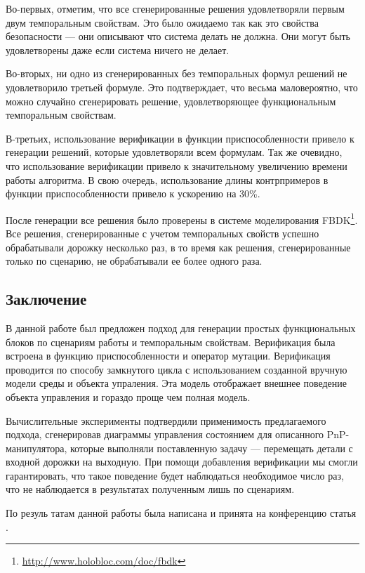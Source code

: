\documentclass[14pt]{article}
\begin{document}
Во-первых, отметим, что все сгенерированные решения удовлетворяли первым двум
темпоральным свойствам. Это было ожидаемо так как это свойства безопасности ---
они описывают что система делать не должна. Они могут быть удовлетворены даже
если система ничего не делает.

Во-вторых, ни одно из сгенерированных без темпоральных формул решений не удовлетворило
третьей формуле. Это подтверждает, что весьма маловероятно, что можно случайно
сгенерировать решение, удовлетворяющее функциональным темпоральным свойствам.

В-третьих, использование верификации в функции приспособленности привело
к генерации решений, которые удовлетворяли всем формулам. Так же очевидно, что использование
верификации привело к значительному увеличению времени работы алгоритма. В свою очередь,
использование длины контрпримеров в функции приспособленности привело к ускорению на 30\%.

После генерации все решения было проверены в системе моделирования FBDK\footnote{\url{http://www.holobloc.com/doc/fbdk}}.
Все решения, сгенерированные с учетом темпоральных свойств успешно обрабатывали дорожку несколько раз,
в то время как решения, сгенерированные только по сценарию, не обрабатывали ее более одного раза.

\subsection{Заключение}

В данной работе был предложен подход для генерации простых функциональных блоков по
сценариям работы и темпоральным свойствам. Верификация была встроена в функцию приспособленности и
оператор мутации. Верификация проводится по способу замкнутого цикла с использованием
созданной вручную модели среды и объекта упраления. Эта модель отображает внешнее поведение
объекта управления и гораздо проще чем полная модель.

Вычислительные эксперименты подтвердили применимость предлагаемого подхода, сгенерировав диаграммы управления состоянием для
описанного PnP-манипулятора, которые выполняли поставленную задачу --- перемещать детали
с входной дорожки на выходную. При помощи добавления верификации мы смогли гарантировать,
что такое поведение будет наблюдаться необходимое число раз, что не наблюдается в
результатах полученным лишь по сценариям.

По резуль татам данной работы была написана и принята на конференцию статья \cite{this}.
\end{document}
